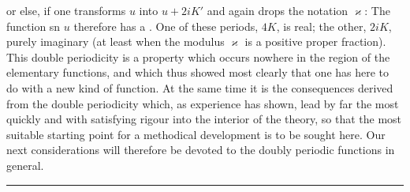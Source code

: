 
or else, if one transforms $u$ into $u+2iK'$ and again drops the notation $\varkappa$:
The function sn $u$ therefore has a . One of these periods, $4K$, is real; the other, $2iK$, purely imaginary %
 (at least when the modulus $\varkappa$ is a positive proper fraction). This double periodicity is a property which occurs nowhere in the region of the elementary functions, and which thus showed most clearly that one has here to do with a new kind of function. At the same time it is the consequences derived from the double periodicity which, as experience has shown, lead by far the most quickly and with satisfying rigour into the interior of the theory, so that the most suitable starting point for a methodical development is to be sought here. Our next considerations will therefore be devoted to the doubly periodic functions in general.
\begin{center}
\rule{3cm}{0.4pt}
\end{center}
